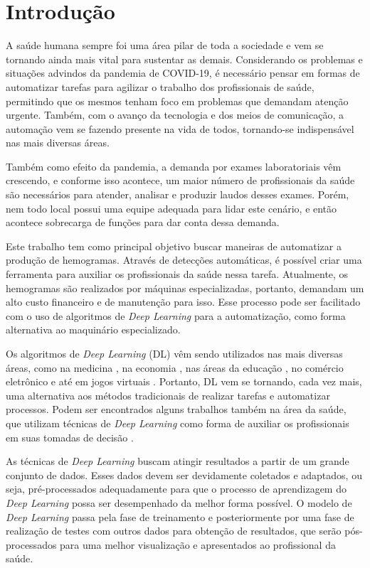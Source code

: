 \chapter{Introdução}
\label{chap:introducao}
A saúde humana sempre foi uma área pilar de toda a sociedade e vem se tornando ainda mais vital para sustentar as demais. Considerando os problemas e situações advindos da pandemia de COVID-19, é necessário pensar em formas de automatizar tarefas para agilizar o trabalho dos profissionais de saúde, permitindo que os mesmos tenham foco em problemas que demandam atenção urgente. Também, com o avanço da tecnologia e dos meios de comunicação, a automação vem se fazendo presente na vida de todos, tornando-se indispensável nas mais diversas áreas.

Também como efeito da pandemia, a demanda por exames laboratoriais vêm crescendo, e conforme isso acontece, um maior número de profissionais da saúde são necessários para atender, analisar e produzir laudos desses exames. Porém, nem todo local possui uma equipe adequada para lidar este cenário, e então acontece sobrecarga de funções para dar conta dessa demanda.

Este trabalho tem como principal objetivo buscar maneiras de automatizar a produção de hemogramas. Através de detecções automáticas, é possível criar uma ferramenta para auxiliar os profissionais da saúde nessa tarefa. Atualmente, os hemogramas são realizados por máquinas especializadas, portanto, demandam um alto custo financeiro e de manutenção para isso. Esse processo pode ser facilitado com o uso de algoritmos de \emph{Deep Learning} para a automatização, como forma alternativa ao maquinário especializado.

Os algoritmos de \emph{Deep Learning} (DL) vêm sendo utilizados nas mais diversas áreas, como na medicina \cite{deepLearningMedicine}, na economia \cite{deepLearningEconomy}, nas áreas da educação \cite{deepLearningEducation}, no comércio eletrônico \cite{deepLearningEcommerce} e até em jogos virtuais \cite{deepLearningGaming}. Portanto, DL vem se tornando, cada vez mais, uma alternativa aos métodos tradicionais de realizar tarefas e automatizar processos. Podem ser encontrados alguns trabalhos também na área da saúde, que utilizam técnicas de \emph{Deep Learning} como forma de auxiliar os profissionais em suas tomadas de decisão \cite{deepLearningHealth1, deepLearningHealth2}.

As técnicas de \emph{Deep Learning} buscam atingir resultados a partir de um grande conjunto de dados. Esses dados devem ser devidamente coletados e adaptados, ou seja, pré-processados adequadamente para que o processo de aprendizagem do \emph{Deep Learning} possa ser desempenhado da melhor forma possível. O modelo de \emph{Deep Learning} passa pela fase de treinamento e posteriormente por uma fase de realização de testes com outros dados para obtenção de resultados, que serão pós-processados para uma melhor visualização e apresentados ao profissional da saúde.

